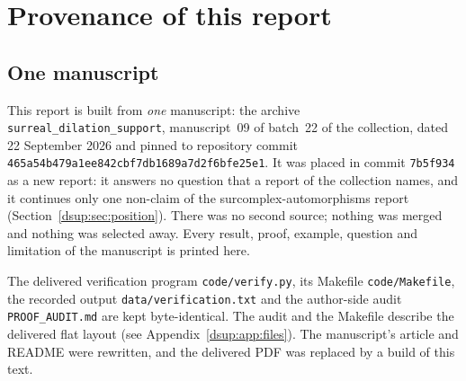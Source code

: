 \documentclass[11pt,oneside]{article}
\numberwithin{equation}{section}
\theoremstyle{definition}
\theoremstyle{remark}
\newcommand{\repo}[1]{\nolinkurl{#1}}%
\begin{document}
\section{Provenance of this report}\label{dsup:app:report}

\subsection{One manuscript}\label{dsup:app:onesource}

This report is built from \emph{one} manuscript: the archive
\texttt{surreal\_dilation\_support}, manuscript~09 of batch~22 of the
collection, dated 22 September 2026 and pinned to repository commit
\nolinkurl{465a54b479a1ee842cbf7db1689a7d2f6bfe25e1}. It was placed in commit
\texttt{7b5f934} as a new report: it answers no question that a report of
the collection names, and it continues only one non-claim of the
surcomplex-automorphisms report (Section~\ref{dsup:sec:position}). There was
no second source; nothing was merged and nothing was selected away. Every
result, proof, example, question and limitation of the manuscript is
printed here.

The delivered verification program \repo{code/verify.py}, its Makefile
\repo{code/Makefile}, the recorded output \repo{data/verification.txt} and
the author-side audit \repo{PROOF_AUDIT.md} are kept byte-identical. The
audit and the Makefile describe the delivered flat layout (see
Appendix~\ref{dsup:app:files}). The manuscript's article and README were
rewritten, and the delivered PDF was replaced by a build of this text.
\end{document}
